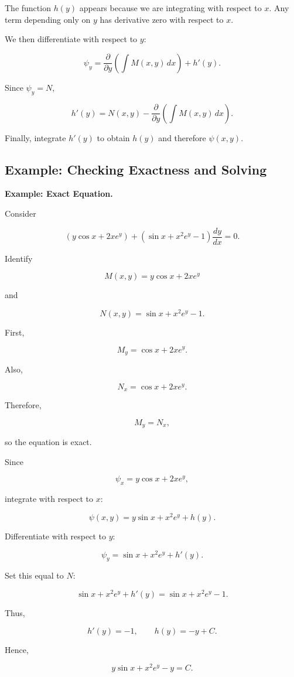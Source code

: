\documentclass[11pt]{article}
\newenvironment{examplebox}[1]
    {\par\medskip\noindent\textbf{Example: #1.}\par}
    {\par\medskip}
\begin{document}
The function $h(y)$ appears because we are integrating with respect
to $x$. Any term depending only on $y$ has derivative zero with respect
to $x$.

We then differentiate with respect to $y$:

\[
\psi_y
=
\frac{\partial}{\partial y}
\left(
\int M(x,y)\,dx
\right)
+h'(y).
\]

Since $\psi_y=N$,

\[
h'(y)
=
N(x,y)
-
\frac{\partial}{\partial y}
\left(
\int M(x,y)\,dx
\right).
\]

Finally, integrate $h'(y)$ to obtain $h(y)$ and therefore $\psi(x,y)$.

\subsection{Example: Checking Exactness and Solving}

\begin{examplebox}{Exact Equation}

Consider

\[
\left(y\cos x+2xe^y\right)
+
\left(\sin x+x^2e^y-1\right)\frac{dy}{dx}
=0.
\]

Identify

\[
M(x,y)=y\cos x+2xe^y
\]

and

\[
N(x,y)=\sin x+x^2e^y-1.
\]

First,

\[
M_y
=
\cos x+2xe^y.
\]

Also,

\[
N_x
=
\cos x+2xe^y.
\]

Therefore,

\[
M_y=N_x,
\]

so the equation is exact.

Since

\[
\psi_x=y\cos x+2xe^y,
\]

integrate with respect to $x$:

\[
\psi(x,y)
=
y\sin x+x^2e^y+h(y).
\]

Differentiate with respect to $y$:

\[
\psi_y
=
\sin x+x^2e^y+h'(y).
\]

Set this equal to $N$:

\[
\sin x+x^2e^y+h'(y)
=
\sin x+x^2e^y-1.
\]

Thus,

\[
h'(y)=-1,
\qquad
h(y)=-y+C.
\]

Hence,

\[
\boxed{
y\sin x+x^2e^y-y=C
}.
\]

\end{examplebox}
\end{document}
